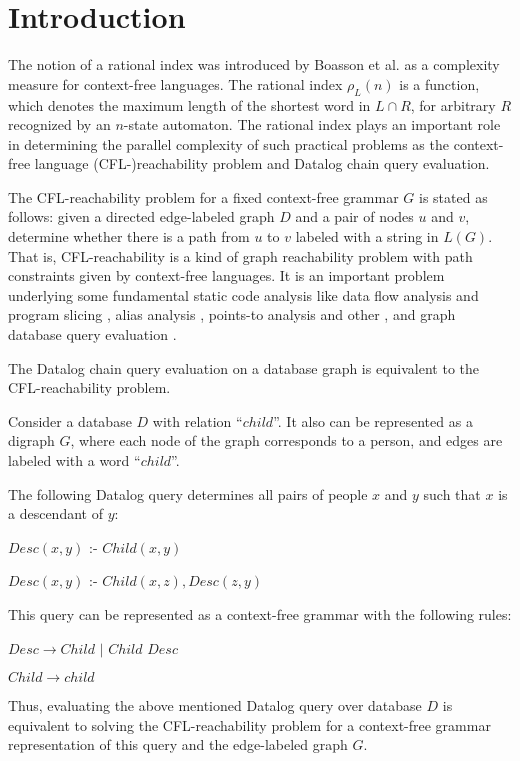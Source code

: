 \documentclass{ws-ijfcs}
\begin{document}

\section{Introduction}
\label{intro}
The notion of a rational index was introduced by Boasson et al. \cite{RatBasic} as a complexity measure for context-free languages.  The rational index $\rho_L(n)$ is a function, which denotes the maximum length of the shortest word in $L \cap R$, for arbitrary $R$ recognized by an $n$-state automaton. The rational index plays an important role in determining the parallel complexity of such practical problems as the context-free language (CFL-)reachability problem and Datalog chain query evaluation.

The CFL-reachability problem for a fixed context-free grammar $G$ is stated as follows: given a directed edge-labeled graph $D$ and a pair of nodes  $u$ and $v$, determine whether there is a path from $u$ to $v$ labeled with a string in $L(G)$.  That is, CFL-reachability is a kind of graph reachability problem with path constraints given by context-free languages. It is an important problem underlying some fundamental static code analysis like data flow analysis and program slicing \cite{RepsBasic}, alias analysis \cite*{Chatterjee, alias}, points-to analysis \cite{Incremental} and other \cite{Cai, android, typeflow}, and graph database query evaluation \cite{Azimov, GrigorevRagozina, HellingsCFPQ, RDF}.  


The Datalog chain query evaluation on a database graph is equivalent to the CFL-reachability problem. 
\begin{example}
\label{DatalogExample}
Consider a database  $D$ with relation ``$child$''. It also can be represented as a digraph $G$, where each node of the graph corresponds to a person, and edges are labeled with a word ``$child$''.


The following Datalog query determines all pairs of people $x$ and $y$ such that $x$ is a descendant of $y$: 


$Desc(x, y)$ :- $Child(x, y)$

$Desc(x, y)$ :- $Child(x, z), Desc(z, y)$


This query can be represented as a context-free grammar with the following rules: 


$Desc \rightarrow Child$ $\vert$ $Child$ $Desc$


$Child  \rightarrow child$


Thus, evaluating the above mentioned Datalog query over database $D$ is equivalent to solving the CFL-reachability problem for a context-free grammar representation of this query and the edge-labeled graph $G$.
\end{example}
\end{document}
